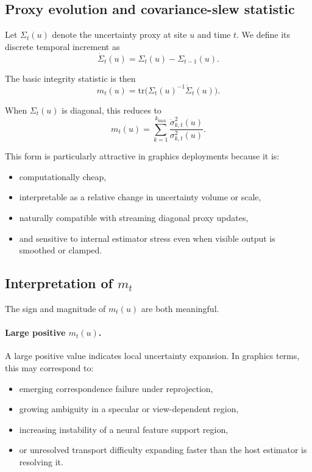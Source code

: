 \documentclass[11pt,letterpaper]{article}
\theoremstyle{gcresult}
\theoremstyle{definition}
\begin{document}

\subsection{Proxy evolution and covariance-slew statistic}

Let $\Sigma_t(u)$ denote the uncertainty proxy at site $u$ and time $t$. We define its discrete temporal increment as
\begin{equation}
\dot{\Sigma}_t(u)=\Sigma_t(u)-\Sigma_{t-1}(u).
\end{equation}

The basic integrity statistic is then
\begin{equation}
m_t(u)=\mathrm{tr}\!\bigl(\Sigma_t(u)^{-1}\dot{\Sigma}_t(u)\bigr).
\end{equation}

When $\Sigma_t(u)$ is diagonal, this reduces to
\begin{equation}
m_t(u)=\sum_{k=1}^{k_{\max}} \frac{\dot{\sigma}^{2}_{k,t}(u)}{\sigma^{2}_{k,t}(u)}.
\end{equation}

This form is particularly attractive in graphics deployments because it is:
\begin{itemize}[leftmargin=1.5em]
    \item computationally cheap,
    \item interpretable as a relative change in uncertainty volume or scale,
    \item naturally compatible with streaming diagonal proxy updates,
    \item and sensitive to internal estimator stress even when visible output is smoothed or clamped.
\end{itemize}


\subsection{Interpretation of $m_t$}

The sign and magnitude of $m_t(u)$ are both meaningful.

\paragraph{Large positive $m_t(u)$.}
A large positive value indicates local uncertainty expansion. In graphics terms, this may correspond to:
\begin{itemize}[leftmargin=1.5em]
    \item emerging correspondence failure under reprojection,
    \item growing ambiguity in a specular or view-dependent region,
    \item increasing instability of a neural feature support region,
    \item or unresolved transport difficulty expanding faster than the host estimator is resolving it.
\end{itemize}
\end{document}
